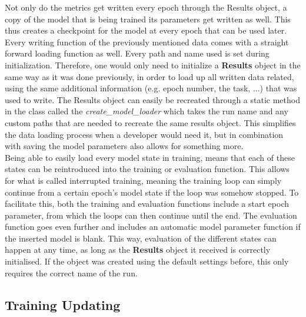 Not only do the metrics get written every epoch through the Results object, a copy of the model that is being trained its parameters get written as well. This thus creates a checkpoint for the model at every epoch that can be used later. Every writing function of the previously mentioned data comes with a straight forward loading function as well. Every path and name used is set during initialization. Therefore, one would only need to initialize a \textbf{Results} object in the same way as it was done previously, in order to load up all written data related, using the same additional information (e.g. epoch number, the task, ...) that was used to write. The Results object can easily be recreated through a static method in the class called the \textit{create\_model\_loader} which takes the run name and any custom paths that are needed to recreate the same results object. This simplifies the data loading process when a developer would need it, but in combination with saving the model parameters also allows for something more. \\

Being able to easily load every model state in training, means that each of these states can be reintroduced into the training or evaluation function. This allows for what is called interrupted training, meaning the training loop can simply continue from a certain epoch's model state if the loop was somehow stopped. To facilitate this, both the training and evaluation functions include a start epoch parameter, from which the loops can then continue until the end. The evaluation function goes even further and includes an automatic model parameter function if the inserted model is blank. This way, evaluation of the different states can happen at any time, as long as the \textbf{Results} object it received is correctly initialised. If the object was created using the default settings before, this only requires the correct name of the run. \\

\subsection{Training Updating} \label{Impl:Training:Updating}

